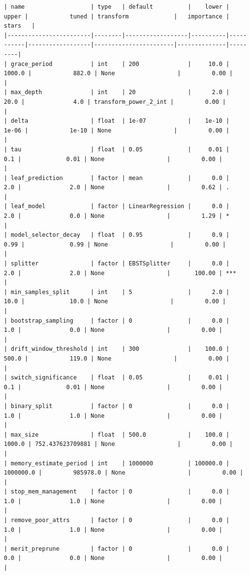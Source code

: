 \documentclass[
  letterpaper,
  DIV=11,
  numbers=noendperiod]{scrreprt}
\begin{document}
\begin{verbatim}
| name                   | type   | default          |    lower |     upper |            tuned | transform             |   importance | stars   |
|------------------------|--------|------------------|----------|-----------|------------------|-----------------------|--------------|---------|
| grace_period           | int    | 200              |     10.0 |    1000.0 |            882.0 | None                  |         0.00 |         |
| max_depth              | int    | 20               |      2.0 |      20.0 |              4.0 | transform_power_2_int |         0.00 |         |
| delta                  | float  | 1e-07            |    1e-10 |     1e-06 |            1e-10 | None                  |         0.00 |         |
| tau                    | float  | 0.05             |     0.01 |       0.1 |             0.01 | None                  |         0.00 |         |
| leaf_prediction        | factor | mean             |      0.0 |       2.0 |              2.0 | None                  |         0.62 | .       |
| leaf_model             | factor | LinearRegression |      0.0 |       2.0 |              0.0 | None                  |         1.29 | *       |
| model_selector_decay   | float  | 0.95             |      0.9 |      0.99 |             0.99 | None                  |         0.00 |         |
| splitter               | factor | EBSTSplitter     |      0.0 |       2.0 |              2.0 | None                  |       100.00 | ***     |
| min_samples_split      | int    | 5                |      2.0 |      10.0 |             10.0 | None                  |         0.00 |         |
| bootstrap_sampling     | factor | 0                |      0.0 |       1.0 |              0.0 | None                  |         0.00 |         |
| drift_window_threshold | int    | 300              |    100.0 |     500.0 |            119.0 | None                  |         0.00 |         |
| switch_significance    | float  | 0.05             |     0.01 |       0.1 |             0.01 | None                  |         0.00 |         |
| binary_split           | factor | 0                |      0.0 |       1.0 |              1.0 | None                  |         0.00 |         |
| max_size               | float  | 500.0            |    100.0 |    1000.0 | 752.437623709881 | None                  |         0.00 |         |
| memory_estimate_period | int    | 1000000          | 100000.0 | 1000000.0 |         985978.0 | None                  |         0.00 |         |
| stop_mem_management    | factor | 0                |      0.0 |       1.0 |              1.0 | None                  |         0.00 |         |
| remove_poor_attrs      | factor | 0                |      0.0 |       1.0 |              1.0 | None                  |         0.00 |         |
| merit_preprune         | factor | 0                |      0.0 |       0.0 |              0.0 | None                  |         0.00 |         |
\end{verbatim}
\end{document}
